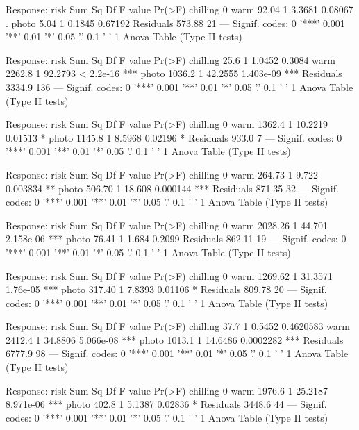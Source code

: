 \documentclass{article}\usepackage[]{graphicx}\usepackage[]{color}
\begin{document}
Response: risk
          Sum Sq Df F value  Pr(>F)  
chilling          0                  
warm       92.04  1  3.3681 0.08067 .
photo       5.04  1  0.1845 0.67192  
Residuals 573.88 21                  
---
Signif. codes:  0 '***' 0.001 '**' 0.01 '*' 0.05 '.' 0.1 ' ' 1
Anova Table (Type II tests)

Response: risk
          Sum Sq  Df F value    Pr(>F)    
chilling    25.6   1  1.0452    0.3084    
warm      2262.8   1 92.2793 < 2.2e-16 ***
photo     1036.2   1 42.2555 1.403e-09 ***
Residuals 3334.9 136                      
---
Signif. codes:  0 '***' 0.001 '**' 0.01 '*' 0.05 '.' 0.1 ' ' 1
Anova Table (Type II tests)

Response: risk
          Sum Sq Df F value  Pr(>F)  
chilling          0                  
warm      1362.4  1 10.2219 0.01513 *
photo     1145.8  1  8.5968 0.02196 *
Residuals  933.0  7                  
---
Signif. codes:  0 '***' 0.001 '**' 0.01 '*' 0.05 '.' 0.1 ' ' 1
Anova Table (Type II tests)

Response: risk
          Sum Sq Df F value   Pr(>F)    
chilling          0                     
warm      264.73  1   9.722 0.003834 ** 
photo     506.70  1  18.608 0.000144 ***
Residuals 871.35 32                     
---
Signif. codes:  0 '***' 0.001 '**' 0.01 '*' 0.05 '.' 0.1 ' ' 1
Anova Table (Type II tests)

Response: risk
           Sum Sq Df F value    Pr(>F)    
chilling           0                      
warm      2028.26  1  44.701 2.158e-06 ***
photo       76.41  1   1.684    0.2099    
Residuals  862.11 19                      
---
Signif. codes:  0 '***' 0.001 '**' 0.01 '*' 0.05 '.' 0.1 ' ' 1
Anova Table (Type II tests)

Response: risk
           Sum Sq Df F value   Pr(>F)    
chilling           0                     
warm      1269.62  1 31.3571 1.76e-05 ***
photo      317.40  1  7.8393  0.01106 *  
Residuals  809.78 20                     
---
Signif. codes:  0 '***' 0.001 '**' 0.01 '*' 0.05 '.' 0.1 ' ' 1
Anova Table (Type II tests)

Response: risk
          Sum Sq Df F value    Pr(>F)    
chilling    37.7  1  0.5452 0.4620583    
warm      2412.4  1 34.8806 5.066e-08 ***
photo     1013.1  1 14.6486 0.0002282 ***
Residuals 6777.9 98                      
---
Signif. codes:  0 '***' 0.001 '**' 0.01 '*' 0.05 '.' 0.1 ' ' 1
Anova Table (Type II tests)

Response: risk
          Sum Sq Df F value    Pr(>F)    
chilling          0                      
warm      1976.6  1 25.2187 8.971e-06 ***
photo      402.8  1  5.1387   0.02836 *  
Residuals 3448.6 44                      
---
Signif. codes:  0 '***' 0.001 '**' 0.01 '*' 0.05 '.' 0.1 ' ' 1
Anova Table (Type II tests)
\end{document}
